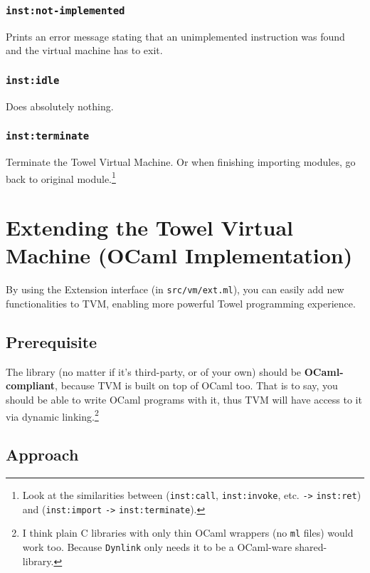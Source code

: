 \documentclass{article}
\newcommand{\inst}[1] {\texttt{inst:#1}}
\begin{document}
\subsubsection{\inst{not-implemented}}

Prints an error message stating that an unimplemented instruction was found and the virtual machine has to exit.

\subsubsection{\inst{idle}}

Does absolutely nothing.

\subsubsection{\inst{terminate}}

Terminate the Towel Virtual Machine. Or when finishing importing modules, go back to original module.\footnote{Look at the similarities between (\inst{call}, \inst{invoke}, etc. \texttt{->} \inst{ret}) and (\inst{import} \texttt{->} \inst{terminate}).}

\section{Extending the Towel Virtual Machine (OCaml Implementation)}

By using the Extension interface (in \texttt{src/vm/ext.ml}), you can easily add new functionalities to TVM, enabling more powerful Towel programming experience.

\subsection{Prerequisite}

The library (no matter if it's third-party, or of your own) should be \textbf{OCaml-compliant}, because TVM is built on top of OCaml too. That is to say, you should be able to write OCaml programs with it, thus TVM will have access to it via dynamic linking.\footnote{I think plain C libraries with only thin OCaml wrappers (no \texttt{ml} files) would work too. Because \texttt{Dynlink} only needs it to be a OCaml-ware shared-library.}

\subsection{Approach}
\end{document}
